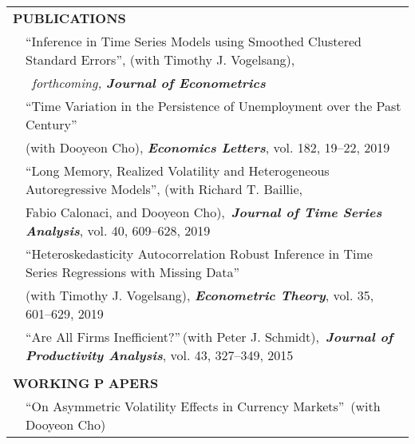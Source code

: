 \documentclass[10pt]{article}
\begin{document}
\begin{center}
\begin{tabular}{llllr}
\multicolumn{5}{l}{{\Large \textbf{P}}\textbf{UBLICATIONS}} \vspace{0.1cm}\\
& \multicolumn{4}{l}{\textquotedblleft Inference in Time Series Models using Smoothed Clustered Standard Errors\textquotedblright, (with Timothy J. Vogelsang),}\\
 & \multicolumn{4}{l}{\,\,\,\emph{forthcoming, {\bf \emph{ Journal of Econometrics}}}} \vspace{0.1cm}\\
& \multicolumn{4}{l}{\textquotedblleft Time Variation in the Persistence of Unemployment over the Past Century\textquotedblright}\\
 & \multicolumn{4}{l}{\hspace{0.2cm}(with Dooyeon Cho), {\bf\emph{Economics Letters}}, vol. 182, 19--22, 2019}  \vspace{0.1cm}\\
& \multicolumn{4}{l}{\textquotedblleft  Long Memory, Realized Volatility and Heterogeneous Autoregressive Models\textquotedblright, (with Richard T. Baillie,}\\
& \multicolumn{4}{l}{\hspace{0.2cm} Fabio Calonaci, and Dooyeon Cho),\, \emph{{\bf\emph{Journal of Time Series Analysis}}}, vol. 40, 609--628, 2019} \vspace{0.1cm}\\
 & \multicolumn{4}{l}{\textquotedblleft Heteroskedasticity Autocorrelation Robust Inference in Time Series Regressions with Missing Data\textquotedblright \ } \\
& \multicolumn{4}{l}{\hspace{0.2cm}(with Timothy J. Vogelsang), \emph{{\bf\emph {Econometric Theory}}}, vol. 35, 601--629, 2019}  \vspace{0.1cm}\\
& \multicolumn{4}{l}{\textquotedblleft Are All Firms Inefficient?\textquotedblright \,(with Peter J. Schmidt),\, {\bf\emph{Journal of Productivity Analysis}}, vol. 43, 327--349, 2015 } \\
\multicolumn{5}{p{500pt}}{}\\
\multicolumn{5}{l}{{\Large \textbf{W}}\textbf{ORKING} {\Large \textbf{P}}%
\textbf{APERS}} \vspace{0.1cm}\\
& \multicolumn{4}{l}{\textquotedblleft On Asymmetric Volatility Effects in Currency Markets\textquotedblright \ (with Dooyeon Cho)} \vspace{0.1cm}\\

\end{tabular}
\end{center}
\end{document}

